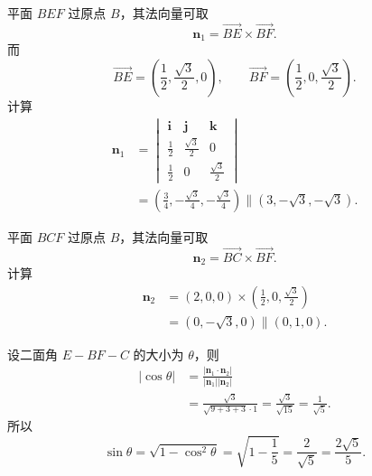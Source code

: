 \begin{answer}
平面 $BEF$ 过原点 $B$，其法向量可取
\nopagebreak[4]
\[\boldsymbol n_1=\overrightarrow{BE}\times\overrightarrow{BF}.\]
而
\nopagebreak[4]
\[\overrightarrow{BE}=\left(\frac12,\frac{\sqrt3}2,0\right),\qquad
\overrightarrow{BF}=\left(\frac12,0,\frac{\sqrt3}2\right).\]
计算
\nopagebreak[4]
\[\begin{aligned}
\boldsymbol n_1
&=\begin{vmatrix}
\boldsymbol i&\boldsymbol j&\boldsymbol k\\
\frac12&\frac{\sqrt3}2&0\\
\frac12&0&\frac{\sqrt3}2
\end{vmatrix}\\
&=\left(\frac34,-\frac{\sqrt3}4,-\frac{\sqrt3}4\right)
\parallel(3,-\sqrt3,-\sqrt3).
\end{aligned}\]

平面 $BCF$ 过原点 $B$，其法向量可取
\nopagebreak[4]
\[\boldsymbol n_2=\overrightarrow{BC}\times\overrightarrow{BF}.\]
计算
\nopagebreak[4]
\[\begin{aligned}
\boldsymbol n_2
&=(2,0,0)\times\left(\frac12,0,\frac{\sqrt3}2\right)\\
&=(0,-\sqrt3,0)\parallel(0,1,0).
\end{aligned}\]

设二面角 $E-BF-C$ 的大小为 $\theta$，则
\nopagebreak[4]
\[\begin{aligned}
|\cos\theta|
&=\frac{|\boldsymbol n_1\cdot\boldsymbol n_2|}
{|\boldsymbol n_1||\boldsymbol n_2|}\\
&=\frac{\sqrt3}{\sqrt{9+3+3}\cdot1}
=\frac{\sqrt3}{\sqrt{15}}
=\frac1{\sqrt5}.
\end{aligned}\]
所以
\nopagebreak[4]
\[\sin\theta=\sqrt{1-\cos^2\theta}
=\sqrt{1-\frac15}
=\frac2{\sqrt5}
=\frac{2\sqrt5}5.\]



\end{answer}
